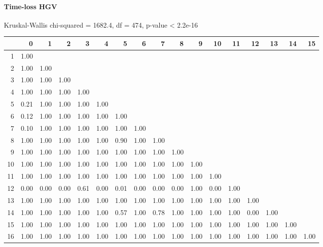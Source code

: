 \paragraph{Time-loss HGV}
Kruskal-Wallis chi-squared = 1682.4, df = 474, p-value < 2.2e-16

% 
\begin{tabular}{rrrrrrrrrrrrrrrrr}
  \hline
 & 0 & 1 & 2 & 3 & 4 & 5 & 6 & 7 & 8 & 9 & 10 & 11 & 12 & 13 & 14 & 15 \\ 
  \hline
1 & 1.00 &  &  &  &  &  &  &  &  &  &  &  &  &  &  &  \\ 
  2 & 1.00 & 1.00 &  &  &  &  &  &  &  &  &  &  &  &  &  &  \\ 
  3 & 1.00 & 1.00 & 1.00 &  &  &  &  &  &  &  &  &  &  &  &  &  \\ 
  4 & 1.00 & 1.00 & 1.00 & 1.00 &  &  &  &  &  &  &  &  &  &  &  &  \\ 
  5 & 0.21 & 1.00 & 1.00 & 1.00 & 1.00 &  &  &  &  &  &  &  &  &  &  &  \\ 
  6 & 0.12 & 1.00 & 1.00 & 1.00 & 1.00 & 1.00 &  &  &  &  &  &  &  &  &  &  \\ 
  7 & 0.10 & 1.00 & 1.00 & 1.00 & 1.00 & 1.00 & 1.00 &  &  &  &  &  &  &  &  &  \\ 
  8 & 1.00 & 1.00 & 1.00 & 1.00 & 1.00 & 0.90 & 1.00 & 1.00 &  &  &  &  &  &  &  &  \\ 
  9 & 1.00 & 1.00 & 1.00 & 1.00 & 1.00 & 1.00 & 1.00 & 1.00 & 1.00 &  &  &  &  &  &  &  \\ 
  10 & 1.00 & 1.00 & 1.00 & 1.00 & 1.00 & 1.00 & 1.00 & 1.00 & 1.00 & 1.00 &  &  &  &  &  &  \\ 
  11 & 1.00 & 1.00 & 1.00 & 1.00 & 1.00 & 1.00 & 1.00 & 1.00 & 1.00 & 1.00 & 1.00 &  &  &  &  &  \\ 
  12 & 0.00 & 0.00 & 0.00 & 0.61 & 0.00 & 0.01 & 0.00 & 0.00 & 0.00 & 1.00 & 0.00 & 1.00 &  &  &  &  \\ 
  13 & 1.00 & 1.00 & 1.00 & 1.00 & 1.00 & 1.00 & 1.00 & 1.00 & 1.00 & 1.00 & 1.00 & 1.00 & 1.00 &  &  &  \\ 
  14 & 1.00 & 1.00 & 1.00 & 1.00 & 1.00 & 0.57 & 1.00 & 0.78 & 1.00 & 1.00 & 1.00 & 1.00 & 0.00 & 1.00 &  &  \\ 
  15 & 1.00 & 1.00 & 1.00 & 1.00 & 1.00 & 1.00 & 1.00 & 1.00 & 1.00 & 1.00 & 1.00 & 1.00 & 1.00 & 1.00 & 1.00 &  \\ 
  16 & 1.00 & 1.00 & 1.00 & 1.00 & 1.00 & 1.00 & 1.00 & 1.00 & 1.00 & 1.00 & 1.00 & 1.00 & 1.00 & 1.00 & 1.00 & 1.00 \\ 
   \hline
\end{tabular}
